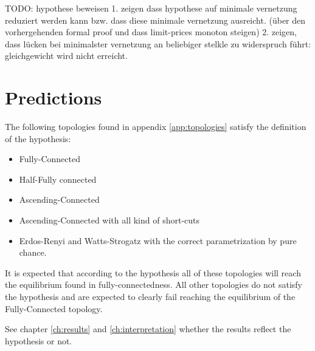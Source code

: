 \documentclass[Bachelorarbeit.tex]{subfiles}
\begin{document}
TODO: hypothese beweisen
1. zeigen dass hypothese auf minimale vernetzung reduziert werden kann bzw. dass diese minimale vernetzung ausreicht. (über den vorhergehenden formal proof und dass limit-prices monoton steigen)
2. zeigen, dass lücken bei minimalster vernetzung an beliebiger stelkle zu widerspruch führt: gleichgewicht wird nicht erreicht. 

\section{Predictions}
The following topologies found in appendix \ref{app:topologies} satisfy the definition of the hypothesis:
 
\begin{itemize}
\item Fully-Connected
\item Half-Fully connected
\item Ascending-Connected
\item Ascending-Connected with all kind of short-cuts
\item Erdos-Renyi and Watts-Strogatz with the correct parametrization by pure chance.
\end{itemize}

It is expected that according to the hypothesis all of these topologies will reach the equilibrium found in fully-connectedness. All other topologies do not satisfy the hypothesis and are expected to clearly fail reaching the equilibrium of the Fully-Connected topology.

\medskip

See chapter \ref{ch:results} and \ref{ch:interpretation} whether the results reflect the hypothesis or not. 
\end{document}
